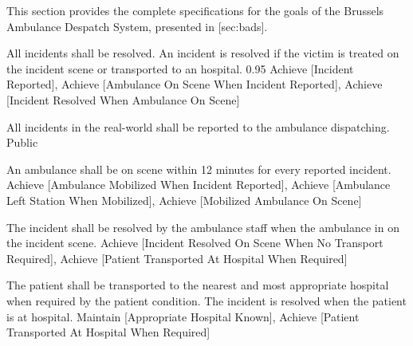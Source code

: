 
\startsubsection[title={Goal specifications}]

  This section provides the complete specifications for the goals of the
  Brussels Ambulance Despatch System, presented in [sec:bads].


    {}

  \startkaosspec
  	 {All incidents shall be resolved. An incident is resolved if the victim is treated on the incident scene or transported to an hospital.}
  	 {0.95}
  	 {Achieve [Incident Reported], Achieve [Ambulance On Scene When Incident Reported], Achieve [Incident Resolved When Ambulance On Scene]}
  \stopkaosspec
  
  \startkaosspec
  	 {All incidents in the real-world shall be reported to the ambulance dispatching.}
  	 {Public}
  \stopkaosspec

  \startkaosspec
  	 {An ambulance shall be on scene within 12 minutes for every reported incident.}
  	 {Achieve [Ambulance Mobilized When Incident Reported], Achieve [Ambulance Left Station When Mobilized], Achieve [Mobilized Ambulance On Scene]}
  \stopkaosspec

  \startkaosspec
  	 {The incident shall be resolved by the ambulance staff when the ambulance in on the incident scene.}
  	 {Achieve [Incident Resolved On Scene When No Transport Required], Achieve [Patient Transported At Hospital When Required]}
  \stopkaosspec
  
  
    {}

  \startkaosspec
  	 {The patient shall be transported to the nearest and most appropriate hospital when required by the patient condition. The incident is resolved when the patient is at hospital.}
  	 {Maintain [Appropriate Hospital Known], Achieve [Patient Transported At Hospital When Required]}
  \stopkaosspec

